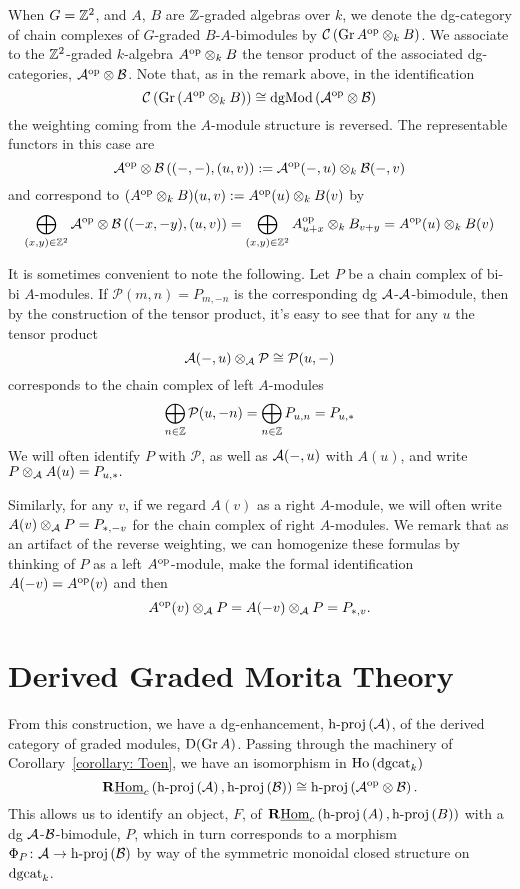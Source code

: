 When \(G = \mathbb{Z}^2\), and \(A\), \(B\) are \(\mathbb{Z}\)-graded algebras over \(k\), we denote the dg-category of chain complexes of \(G\)-graded \(B\)-\(A\)-bimodules by \(\mathcal{C}\left(\operatorname{Gr}A^{\operatorname{op}} \otimes_k B\right)\).
We associate to the \(\mathbb{Z}^2\)-graded \(k\)-algebra \(A^{\operatorname{op}} \otimes_k B\) the tensor product of the associated dg-categories, \(\mathcal{A}^{\operatorname{op}} \otimes \mathcal{B}\).
Note that, as in the remark above, in the identification
\[\mathcal{C}\left(\operatorname{Gr}\left(A^{\operatorname{op}} \otimes_k B\right)\right) \cong \operatorname{dgMod}\left(\mathcal{A}^{\operatorname{op}} \otimes \mathcal{B}\right)\]
the weighting coming from the \(A\)-module structure is reversed.
The representable functors in this case are
\[\mathcal{A}^{\operatorname{op}} \otimes \mathcal{B}\left((-,-), (u,v)\right) := \mathcal{A}^{\operatorname{op}}(-, u) \otimes_k \mathcal{B}(-,v)\]
and correspond to \((A^{\operatorname{op}} \otimes_k B)(u,v) := A^{\operatorname{op}}(u) \otimes_k B(v)\) by 
\[\bigoplus_{(x,y) \in \mathbb{Z}^2} \mathcal{A}^{\operatorname{op}} \otimes \mathcal{B}\left((-x,-y),(u,v)\right) = \bigoplus_{(x,y) \in \mathbb{Z}^2} A^{\operatorname{op}}_{u + x} \otimes_k B_{v + y} = A^{\operatorname{op}}(u) \otimes_k B(v)\]


\begin{remark}\label{remark: tensor with twist}
  It is sometimes convenient to note the following.
  Let \(P\) be a chain complex of bi-bi \(A\)-modules.
  If \(\mathcal{P}(m,n) = P_{m,-n}\) is the corresponding dg \(\mathcal{A}\)-\(\mathcal{A}\)-bimodule, then by the construction of the tensor product, it's easy to see that for any \(u\) the tensor product 
  \[\mathcal{A}(-, u) \otimes_{\mathcal{A}} \mathcal{P} \cong \mathcal{P}(u, -)\]
  corresponds to the chain complex of left \(A\)-modules
  \[\bigoplus_{n \in \mathbb{Z}} \mathcal{P}(u,-n) = \bigoplus_{n \in \mathbb{Z}} P_{u,n} = P_{u, \ast}\]
  We will often identify \(P\) with \(\mathcal{P}\), as well as \(\mathcal{A}(-, u)\) with \(A(u)\), and write
  \(P \otimes_{\mathcal{A}} A(u)= P_{u,\ast}.\)

  Similarly, for any \(v\), if we regard \(A(v)\) as a right \(A\)-module, we will often write \(A(v) \otimes_{\mathcal{A}} P = P_{\ast,-v}\) for the chain complex of right \(A\)-modules.
  We remark that as an artifact of the reverse weighting, we can homogenize these formulas by thinking of \(P\) as a left \(A^{\operatorname{op}}\)-module, make the formal identification \(A(-v) = A^{\operatorname{op}}(v)\) and then
  \[A^{\operatorname{op}}(v) \otimes_{\mathcal{A}} P = A(-v) \otimes_{\mathcal{A}} P = P_{\ast,v}.\]
\end{remark}
\section{Derived Graded Morita Theory}
From this construction, we have a dg-enhancement, \(\operatorname{h-proj}\left(\mathcal{A}\right)\), of the derived category of graded modules, \(\mathrm{D}(\operatorname{Gr}A)\).
Passing through the machinery of Corollary~\ref{corollary: Toen}, we have an isomorphism in \(\operatorname{Ho}\left(\operatorname{dgcat}_k\right)\)
\[\mathbf{R}\underline{\operatorname{Hom}}_c\left(\operatorname{h-proj}\left(\mathcal{A}\right), \operatorname{h-proj}\left(\mathcal{B}\right)\right) \cong \operatorname{h-proj}\left(\mathcal{A}^{\operatorname{op}} \otimes \mathcal{B}\right).\]
This allows us to identify an object, \(F\), of \(\mathbf{R}\underline{\operatorname{Hom}}_c\left(\operatorname{h-proj}\left(A\right), \operatorname{h-proj}\left(B\right)\right)\) with a dg \(\mathcal{A}\)-\(\mathcal{B}\)-bimodule, \(P\), which in turn corresponds to a morphism \(\Phi_P \colon \mathcal{A} \to \operatorname{h-proj}\left(\mathcal{B}\right)\) by way of the symmetric monoidal closed structure on \(\operatorname{dgcat}_k\).

